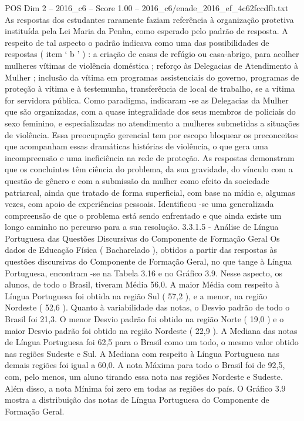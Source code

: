 \begin{textsample}{POS Dim 2 – 2016\_c6 – Score 1.00 – 2016\_c6/enade\_2016\_ef\_4c62fccdfb.txt}
As respostas dos estudantes raramente faziam referência à organização protetiva instituída pela Lei Maria da Penha, como esperado pelo padrão de resposta.
A respeito de tal aspecto o padrão indicava como uma das possibilidades de respostas ( item ‘ b ’ ) : a criação de casas de refúgio ou casa-abrigo, para acolher mulheres vítimas de violência doméstica ; reforço às Delegacias de Atendimento à Mulher ; inclusão da vítima em programas assistenciais do governo, programas de proteção à vítima e à testemunha, transferência de local de trabalho, se a vítima for servidora pública.
Como paradigma, indicaram -se as Delegacias da Mulher que são organizadas, com a quase integralidade dos seus membros de policiais do sexo feminino, e especializadas no atendimento a mulheres submetidas a situações de violência.
Essa preocupação gerencial tem por escopo bloquear os preconceitos que acompanham essas dramáticas histórias de violência, o que gera uma incompreensão e uma ineficiência na rede de proteção.
As respostas demonstram que os concluintes têm ciência do problema, da sua gravidade, do vínculo com a questão de gênero e com a submissão da mulher como efeito da sociedade patriarcal, ainda que tratado de forma superficial, com base na mídia e, algumas vezes, com apoio de experiências pessoais.
Identificou -se uma generalizada compreensão de que o problema está sendo enfrentado e que ainda existe um longo caminho no percurso para a sua resolução. 3.3.1.5 - Análise de Língua Portuguesa das Questões Discursivas do Componente de Formação Geral Os dados de Educação Física ( Bacharelado ), obtidos a partir das respostas às questões discursivas do Componente de Formação Geral, no que tange à Língua Portuguesa, encontram -se na Tabela 3.16 e no Gráfico 3.9.
Nesse aspecto, os alunos, de todo o Brasil, tiveram Média 56,0.
A maior Média com respeito à Língua Portuguesa foi obtida na região Sul ( 57,2 ), e a menor, na região Nordeste ( 52,6 ).
Quanto à variabilidade das notas, o Desvio padrão de todo o Brasil foi 21,3.
O menor Desvio padrão foi obtido na região Norte ( 19,0 ) e o maior Desvio padrão foi obtido na região Nordeste ( 22,9 ).
A Mediana das notas de Língua Portuguesa foi 62,5 para o Brasil como um todo, o mesmo valor obtido nas regiões Sudeste e Sul.
A Mediana com respeito à Língua Portuguesa nas demais regiões foi igual a 60,0.
A nota Máxima para todo o Brasil foi de 92,5, com, pelo menos, um aluno tirando essa nota nas regiões Nordeste e Sudeste.
Além disso, a nota Mínima foi zero em todas as regiões do país.
O Gráfico 3.9 mostra a distribuição das notas de Língua Portuguesa do Componente de Formação Geral.

\end{textsample}
